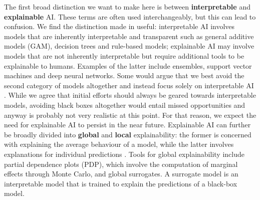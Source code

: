 \documentclass{juliacon}
\begin{document}
The first broad distinction we want to make here is between
\textbf{interpretable} and \textbf{explainable} AI. These terms are
often used interchangeably, but this can lead to confusion. We find the
distinction made in \cite{rudin2019stop} useful: interpretable AI
involves models that are inherently interpretable and transparent such
as general additive models (GAM), decision trees and rule-based models;
explainable AI may involve models that are not inherently interpretable
but require additional tools to be explainable to humans. Examples of
the latter include ensembles, support vector machines and deep neural
networks. Some would argue that we best avoid the second category of
models altogether and instead focus solely on interpretable AI
\cite{rudin2019stop}. While we agree that initial efforts should always
be geared towards interpretable models, avoiding black boxes altogether
would entail missed opportunities and anyway is probably not very
realistic at this point. For that reason, we expect the need for
explainable AI to persist in the near future. Explainable AI can further
be broadly divided into \textbf{global} and \textbf{local}
explainability: the former is concerned with explaining the average
behaviour of a model, while the latter involves explanations for
individual predictions \cite{molnar2020interpretable}. Tools for global
explainability include partial dependence plots (PDP), which involve the
computation of marginal effects through Monte Carlo, and global
surrogates. A surrogate model is an interpretable model that is trained
to explain the predictions of a black-box model.
\end{document}
